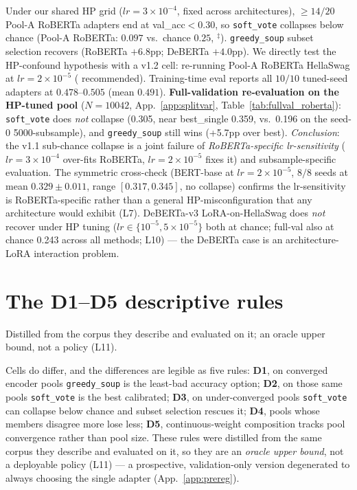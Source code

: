 \documentclass[11pt]{article}
\begin{document}
Under our shared HP grid ($lr{=}3{\times}10^{-4}$, fixed across architectures), $\geq 14/20$ Pool-A RoBERTa adapters end at val\_acc${<}0.30$, so \texttt{soft\_vote} collapses below chance (Pool-A RoBERTa: $0.097$ vs.\ chance $0.25$, $^{\ddagger}$). \texttt{greedy\_soup} subset selection recovers (RoBERTa $+6.8$pp; DeBERTa $+4.0$pp). We directly test the HP-confound hypothesis with a v1.2 cell: re-running Pool-A RoBERTa HellaSwag at $lr{=}2{\times}10^{-5}$ (\citealp{liu2019roberta} recommended). Training-time eval reports all $10/10$ tuned-seed adapters at $0.478$--$0.505$ (mean $0.491$). \textbf{Full-validation re-evaluation on the HP-tuned pool} ($N{=}10042$, App.~\ref{app:splitvar}, Table~\ref{tab:fullval_roberta}): \texttt{soft\_vote} does \emph{not} collapse (0.305, near best\_single 0.359, vs.\ 0.196 on the seed-0 5000-subsample), and \texttt{greedy\_soup} still wins (+5.7pp over best). \emph{Conclusion}: the v1.1 sub-chance collapse is a joint failure of \emph{RoBERTa-specific lr-sensitivity} ($lr{=}3{\times}10^{-4}$ over-fits RoBERTa, $lr{=}2{\times}10^{-5}$ fixes it) and subsample-specific evaluation. The symmetric cross-check (BERT-base at $lr{=}2{\times}10^{-5}$, $8/8$ seeds at mean $0.329 \pm 0.011$, range $[0.317, 0.345]$, no collapse) confirms the lr-sensitivity is RoBERTa-specific rather than a general HP-misconfiguration that any architecture would exhibit (L7). DeBERTa-v3 LoRA-on-HellaSwag does \emph{not} recover under HP tuning ($lr{\in}\{10^{-5}, 5{\times}10^{-5}\}$ both at chance; full-val also at chance 0.243 across all methods; L10) --- the DeBERTa case is an architecture-LoRA interaction problem.


\section{The D1--D5 descriptive rules}\label{app:rules}
Distilled from the corpus they describe and evaluated on it; an oracle upper bound, not a policy (L11).

Cells do differ, and the differences are legible as five rules: \textbf{D1}, on converged encoder pools \texttt{greedy\_soup} is the least-bad accuracy option; \textbf{D2}, on those same pools \texttt{soft\_vote} is the best calibrated; \textbf{D3}, on under-converged pools \texttt{soft\_vote} can collapse below chance and subset selection rescues it; \textbf{D4}, pools whose members disagree more lose less; \textbf{D5}, continuous-weight composition tracks pool convergence rather than pool size. These rules were distilled from the same corpus they describe and evaluated on it, so they are an \emph{oracle upper bound}, not a deployable policy (L11) --- a prospective, validation-only version degenerated to always choosing the single adapter (App.~\ref{app:prereg}).
\end{document}
